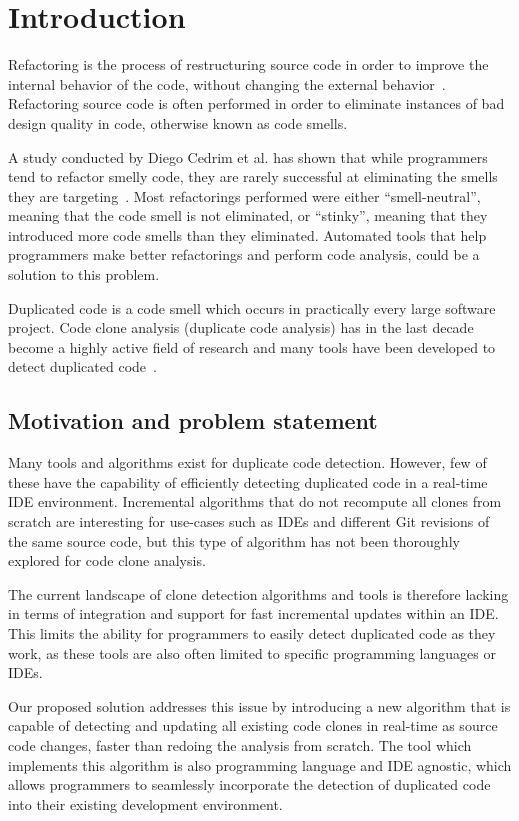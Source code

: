 \chapter{Introduction}

Refactoring is the process of restructuring source code in order to improve the internal behavior
of the code, without changing the external behavior~\cite[9]{fowlerrefactoring}.
Refactoring source code is often performed in order to eliminate instances of bad
design quality in code, otherwise known as code smells.

A study conducted by Diego Cedrim et al. has shown that while programmers tend to refactor
smelly code, they are rarely successful at eliminating the smells they are
targeting~\cite{Rohit_Gheyi_Impact}. Most refactorings performed were either
``smell-neutral'', meaning that the code smell is not eliminated, or ``stinky'',
meaning that they introduced more code smells than they eliminated. Automated tools that
help programmers make better refactorings and perform code analysis, could be a solution to
this problem.

Duplicated code is a code smell which occurs in practically every large software project.
Code clone analysis (duplicate code analysis) has in the last decade become a highly active field
of research and many tools have been developed to detect duplicated
code~\cite[6]{Inoue_introduction_to_cc}. 

\section{Motivation and problem statement}

Many tools and algorithms exist for duplicate code detection. However, few of these have
the capability of efficiently detecting duplicated code in a real-time IDE environment.
Incremental algorithms that do not recompute all clones from scratch are interesting for
use-cases such as IDEs and different Git revisions of the same source code, but this type of
algorithm has not been thoroughly explored for code clone analysis.

The current landscape of clone detection algorithms and tools is therefore lacking in
terms of integration and support for fast incremental updates within an IDE. This limits
the ability for programmers to easily detect duplicated code as they work, as these tools
are also often limited to specific programming languages or IDEs.

Our proposed solution addresses this issue by introducing a new algorithm that is capable
of detecting and updating all existing code clones in real-time as source code changes,
faster than redoing the analysis from scratch. The tool which implements this algorithm is
also programming language and IDE agnostic, which allows programmers to seamlessly
incorporate the detection of duplicated code into their existing development environment.


